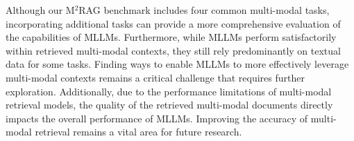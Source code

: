 Although our M$^2$RAG benchmark includes four common multi-modal tasks, incorporating additional tasks can provide a more comprehensive evaluation of the capabilities of MLLMs. Furthermore, while MLLMs perform satisfactorily within retrieved multi-modal contexts, they still rely predominantly on textual data for some tasks. Finding ways to enable MLLMs to more effectively leverage multi-modal contexts remains a critical challenge that requires further exploration. Additionally, due to the performance limitations of multi-modal retrieval models, the quality of the retrieved multi-modal documents directly impacts the overall performance of MLLMs. Improving the accuracy of multi-modal retrieval remains a vital area for future research.









